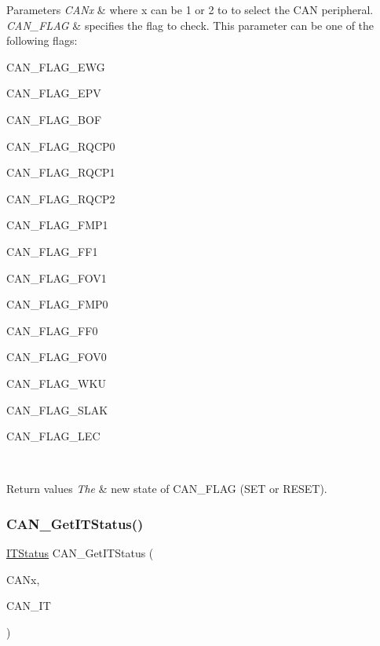 \begin{DoxyParams}{Parameters}
{\em C\+A\+Nx} & where x can be 1 or 2 to to select the C\+AN peripheral. \\
\hline
{\em C\+A\+N\+\_\+\+F\+L\+AG} & specifies the flag to check. This parameter can be one of the following flags\+:
\begin{DoxyItemize}
\item C\+A\+N\+\_\+\+F\+L\+A\+G\+\_\+\+E\+WG
\item C\+A\+N\+\_\+\+F\+L\+A\+G\+\_\+\+E\+PV
\item C\+A\+N\+\_\+\+F\+L\+A\+G\+\_\+\+B\+OF
\item C\+A\+N\+\_\+\+F\+L\+A\+G\+\_\+\+R\+Q\+C\+P0
\item C\+A\+N\+\_\+\+F\+L\+A\+G\+\_\+\+R\+Q\+C\+P1
\item C\+A\+N\+\_\+\+F\+L\+A\+G\+\_\+\+R\+Q\+C\+P2
\item C\+A\+N\+\_\+\+F\+L\+A\+G\+\_\+\+F\+M\+P1
\item C\+A\+N\+\_\+\+F\+L\+A\+G\+\_\+\+F\+F1
\item C\+A\+N\+\_\+\+F\+L\+A\+G\+\_\+\+F\+O\+V1
\item C\+A\+N\+\_\+\+F\+L\+A\+G\+\_\+\+F\+M\+P0
\item C\+A\+N\+\_\+\+F\+L\+A\+G\+\_\+\+F\+F0
\item C\+A\+N\+\_\+\+F\+L\+A\+G\+\_\+\+F\+O\+V0
\item C\+A\+N\+\_\+\+F\+L\+A\+G\+\_\+\+W\+KU
\item C\+A\+N\+\_\+\+F\+L\+A\+G\+\_\+\+S\+L\+AK
\item C\+A\+N\+\_\+\+F\+L\+A\+G\+\_\+\+L\+EC
\end{DoxyItemize}\\
\hline
\end{DoxyParams}

\begin{DoxyRetVals}{Return values}
{\em The} & new state of C\+A\+N\+\_\+\+F\+L\+AG (S\+ET or R\+E\+S\+ET). \\
\hline
\end{DoxyRetVals}
\mbox{\label{group___c_a_n___private___functions_ga9aca05b3013e1b3438f3559f80b33c82}} 
\subsubsection{\texorpdfstring{CAN\_GetITStatus()}{CAN\_GetITStatus()}}
{\footnotesize\ttfamily \mbox{\hyperlink{group___exported__types_gaacbd7ed539db0aacd973a0f6eca34074}{I\+T\+Status}} C\+A\+N\+\_\+\+Get\+I\+T\+Status (\begin{DoxyParamCaption}\item[{\mbox{\hyperlink{struct_c_a_n___type_def}{C\+A\+N\+\_\+\+Type\+Def}} $\ast$}]{C\+A\+Nx,  }\item[{uint32\+\_\+t}]{C\+A\+N\+\_\+\+IT }\end{DoxyParamCaption})}



